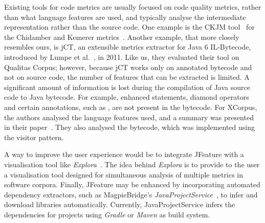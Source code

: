 Existing tools for code metrics are usually focused on code quality metrics, rather than what language features are used, and typically analyse the intermediate representation rather than the source code. One example is the CKJM tool~\cite{Spi05g} for the Chidamber and Kemerer metrics~\cite{chidamber1994metrics}. Another example, that more closely resembles ours, is jCT, an extensible metrics extractor for Java 6 IL-Bytecode, introduced by Lumpe et al.~\cite{jCT}, in 2011.
Like us, they evaluated their tool on Qualitas Corpus; however, because jCT works only on annotated bytecode and not on
source code, the number of features that can be extracted is limited.
A significant amount of information is lost during the compilation of Java source code to Java bytecode.
For example, enhanced  statements, diamond operators and certain annotations, such as , are not present in the bytecode.
For XCorpus, the authors analysed the language features used, and a summary was presented in their paper~\cite{dietrich2017xcorpus}.
They also analysed the bytecode, which was implemented using the visitor pattern.



A way to improve the user experience would be to integrate JFeature with a visualisation tool like \textit{Explora}~\cite{merino2015explora}. The idea
behind \textit{Explora} is to provide to the user a visualisation tool designed for simultaneous analysis of multiple metrics in software corpora.
Finally, JFeature may be enhanced by incorporating automated dependency extractors, such as MagpieBridge's \emph{JavaProjectService}~\cite{luo_et_al:LIPIcs:2019:10813}, to infer and download libraries automatically. Currently, JavaProjectService infers the dependencies for projects using \emph{Gradle} or \emph{Maven} as build system.



